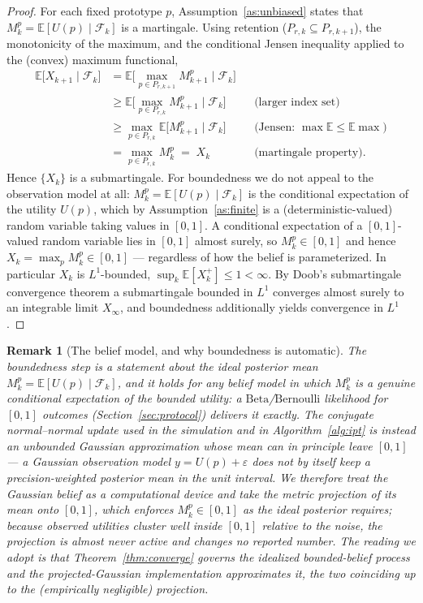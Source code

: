 \documentclass[11pt]{article}
\newtheorem{remark}{Remark}
\newcommand{\E}{\mathbb{E}}
\newcommand{\filt}{\mathcal{F}}     %
\begin{document}
\begin{proof}
For each fixed prototype $p$, Assumption~\ref{as:unbiased} states that $M_k^{p}=\E[U(p)\mid\filt_k]$ is a martingale. Using retention ($P_{r,k}\subseteq P_{r,k+1}$), the monotonicity of the maximum, and the conditional Jensen inequality applied to the (convex) maximum functional,
\begin{align}
\E\!\big[X_{k+1}\mid\filt_k\big]
&= \E\!\Big[\max_{p\in P_{r,k+1}} M_{k+1}^{p}\;\Big|\;\filt_k\Big] \nonumber\\
&\ge \E\!\Big[\max_{p\in P_{r,k}} M_{k+1}^{p}\;\Big|\;\filt_k\Big]
   &&\text{(larger index set)}\nonumber\\
&\ge \max_{p\in P_{r,k}} \E\!\big[M_{k+1}^{p}\mid\filt_k\big]
   &&\text{(Jensen: } \max\E \le \E\max)\nonumber\\
&= \max_{p\in P_{r,k}} M_{k}^{p} \;=\; X_k
   &&\text{(martingale property).}
\end{align}
Hence $\{X_k\}$ is a submartingale. For boundedness we do not appeal to the observation model at all: $M_k^{p}=\E[U(p)\mid\filt_k]$ is the conditional expectation of the utility $U(p)$, which by Assumption~\ref{as:finite} is a (deterministic-valued) random variable taking values in $[0,1]$. A conditional expectation of a $[0,1]$-valued random variable lies in $[0,1]$ almost surely, so $M_k^{p}\in[0,1]$ and hence $X_k=\max_{p}M_k^{p}\in[0,1]$ --- regardless of how the belief is parameterized. In particular $X_k$ is $L^1$-bounded, $\sup_k\E[X_k^{+}]\le 1<\infty$. By Doob's submartingale convergence theorem a submartingale bounded in $L^1$ converges almost surely to an integrable limit $X_\infty$, and boundedness additionally yields convergence in $L^1$.
\end{proof}

\begin{remark}[The belief model, and why boundedness is automatic]
\label{rem:bounded}
The boundedness step is a statement about the \emph{ideal} posterior mean $M_k^{p}=\E[U(p)\mid\filt_k]$, and it holds for \emph{any} belief model in which $M_k^{p}$ is a genuine conditional expectation of the bounded utility: a $\mathrm{Beta}$/$\mathrm{Bernoulli}$ likelihood for $[0,1]$ outcomes (Section~\ref{sec:protocol}) delivers it exactly. The conjugate normal--normal update used in the simulation and in Algorithm~\ref{alg:ipt} is instead an \emph{unbounded Gaussian approximation} whose mean can in principle leave $[0,1]$ --- a Gaussian observation model $y=U(p)+\varepsilon$ does not by itself keep a precision-weighted posterior mean in the unit interval. We therefore treat the Gaussian belief as a computational device and take the \emph{metric projection} of its mean onto $[0,1]$, which enforces $M_k^{p}\in[0,1]$ as the ideal posterior requires; because observed utilities cluster well inside $[0,1]$ relative to the noise, the projection is almost never active and changes no reported number. The reading we adopt is that Theorem~\ref{thm:converge} governs the idealized bounded-belief process and the projected-Gaussian implementation approximates it, the two coinciding up to the (empirically negligible) projection.
\end{remark}
\end{document}
